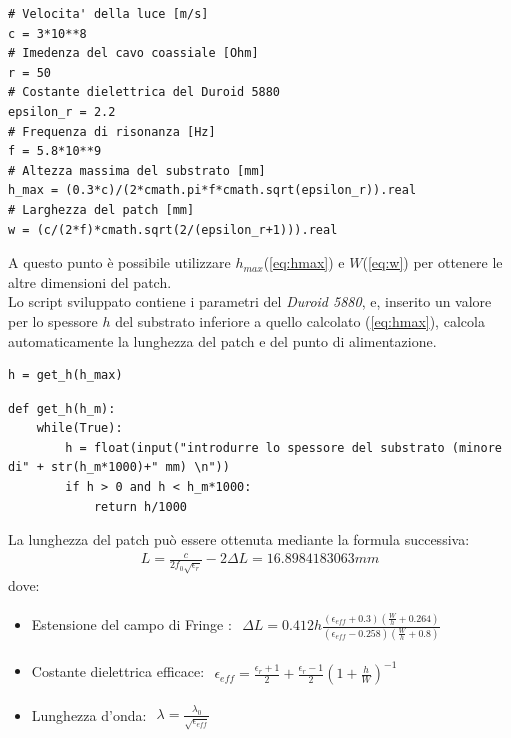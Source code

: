 \begin{verbatim}
# Velocita' della luce [m/s]
c = 3*10**8
# Imedenza del cavo coassiale [Ohm]
r = 50
# Costante dielettrica del Duroid 5880
epsilon_r = 2.2
# Frequenza di risonanza [Hz]
f = 5.8*10**9
# Altezza massima del substrato [mm]
h_max = (0.3*c)/(2*cmath.pi*f*cmath.sqrt(epsilon_r)).real
# Larghezza del patch [mm]
w = (c/(2*f)*cmath.sqrt(2/(epsilon_r+1))).real
\end{verbatim}

A questo punto è possibile utilizzare $h_{max}$(\ref{eq:hmax}) e $W$(\ref{eq:w}) per ottenere le altre dimensioni del patch. \\
Lo script sviluppato contiene i parametri del \emph{Duroid 5880}, e, inserito un valore per lo spessore $h$ del substrato inferiore a quello calcolato (\ref{eq:hmax}), calcola automaticamente la lunghezza del patch e del punto di alimentazione. \\
\begin{verbatim}
h = get_h(h_max)
\end{verbatim}

\begin{verbatim}
def get_h(h_m):
    while(True):
        h = float(input("introdurre lo spessore del substrato (minore di" + str(h_m*1000)+" mm) \n"))
        if h > 0 and h < h_m*1000:
            return h/1000
\end{verbatim}
La lunghezza del patch può essere ottenuta mediante la formula successiva:
\begin{align}
L = \frac{c}{2f_0\sqrt{\epsilon_r}} - 2 \Delta L = 16.8984183063 mm 
\end{align}
dove: 
\begin{itemize}
\item Estensione del campo di Fringe :
$\begin{aligned}
\Delta L = 0.412 h \frac{(\epsilon_{eff}+0.3)(\frac{W}{h}+0.264)}{(\epsilon_{eff}-0.258)(\frac{W}{h}+0.8)} 
\end{aligned}$
\item Costante dielettrica efficace:
$\begin{aligned}
\epsilon_{eff} = \frac{\epsilon_r+1}{2} + \frac{\epsilon_r-1}{2} (1 + \frac{h}{W})^{-1}
\end{aligned}$
\item Lunghezza d'onda:
$\begin{aligned}
\lambda = \frac{\lambda_0}{\sqrt{\epsilon_{eff}}}
\end{aligned}$
\end{itemize}

